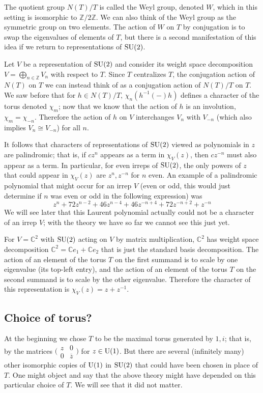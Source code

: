 \documentclass[../../rtnotes.tex]{subfiles}
\begin{document}
The quotient group $N(T)/T$ is called the Weyl group, denoted $W$, which in this setting is isomorphic to $\mathbb Z/2\mathbb Z$. We can also think of the Weyl group as the symmetric group on two elements. The action of $W$ on $T$ by conjugation is to swap the eigenvalues of elements of $T$, but there is a second manifestation of this idea if we return to representations of $\operatorname{SU}(2)$.

Let $V$ be a representation of $\operatorname{SU}(2)$ and consider its weight space decomposition $V = \bigoplus_{n\in\mathbb Z}V_n$ with respect to $T$. Since $T$ centralizes $T$, the conjugation action of $N(T)$ on $T$ we can instead think of as a conjugation action of $N(T)/T$ on $T$. We saw before that for $h\in N(T)/T$, $\chi_n(h^{-1}(-)h)$ defines a character of the torus denoted $\chi_m$; now that we know that the action of $h$ is an involution, $\chi_m = \chi_{-n}$. Therefore the action of $h$ on $V$ interchanges $V_n$ with $V_{-n}$ (which also implies $V_n\cong V_{-n}$) for all $n$.

It follows that characters of representations of $\operatorname{SU}(2)$ viewed as polynomials in $z$ are palindromic; that is, if $cz^n$ appears as a term in $\chi_V(z)$, then $cz^{-n}$ must also appear as a term. In particular, for even irreps of $\operatorname{SU}(2)$, the only powers of $z$ that could appear in $\chi_V(z)$ are $z^n,z^{-n}$ for $n$ even. An example of a palindromic polynomial that might occur for an irrep $V$ (even or odd, this would just determine if $n$ was even or odd in the following expression) was 
\[z^n + 72z^{n-2} + 46z^{n-4} + 46z^{-n+4} + 72z^{-n+2} + z^{-n}\]
We will see later that this Laurent polynomial actually could not be a character of an irrep $V$; with the theory we have so far we cannot see this just yet.

For $V = \mathbb C^2$ with $\operatorname{SU}(2)$ acting on $V$ by matrix multiplication, $\mathbb C^2$ has weight space decomposition $\mathbb C^2 = \mathbb Ce_1 + \mathbb Ce_2$ that is just the standard basis decomposition. The action of an element of the torus $T$ on the first summand is to scale by one eigenvalue (its top-left entry), and the action of an element of the torus $T$ on the second summand is to scale by the other eigenvalue. Therefore the character of this representation is $\chi_V(z) = z+z^{-1}$.

\subsection{Choice of torus?}
At the beginning we chose $T$ to be the maximal torus generated by $1,i$; that is, by the matrices $\bigl(\!\begin{smallmatrix}
    z & 0 \\ 0 & \overline z
\end{smallmatrix}\!\bigr)$ for $z\in\operatorname{U}(1)$. But there are several (infinitely many) other isomorphic copies of $\operatorname{U}(1)$ in $\operatorname{SU}(2)$ that could have been chosen in place of $T$. One might object and say that the above theory might have depended on this particular choice of $T$. We will see that it did not matter. 
\end{document}
